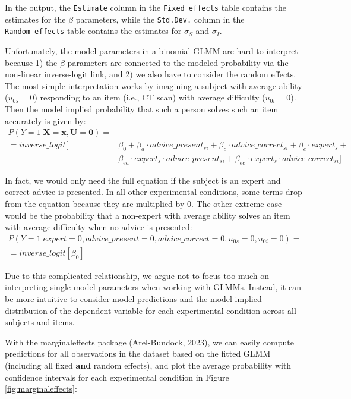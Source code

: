 \documentclass[
  man,floatsintext]{apa6}
\begin{document}
In the output, the \texttt{Estimate} column in the \texttt{Fixed\ effects} table contains the estimates for the \(\beta\) parameters, while the \texttt{Std.Dev.} column in the \texttt{Random\ effects} table contains the estimates for \(\sigma_S\) and \(\sigma_I\).

Unfortunately, the model parameters in a binomial GLMM are hard to interpret because 1) the \(\beta\) parameters are connected to the modeled probability via the non-linear inverse-logit link, and 2) we also have to consider the random effects. The most simple interpretation works by imagining a subject with average ability (\(u_{0s} = 0\)) responding to an item (i.e., CT scan) with average difficulty (\(u_{0i} = 0\)). Then the model implied probability that such a person solves such an item accurately is given by: \[
\begin{aligned}
P(Y=1|\mathbf{X=x}, \mathbf{U} = \mathbf{0}) = \\
= inverse\_logit[&\beta_0 + \beta_a \cdot advice\_present_{si} + \beta_c \cdot advice\_correct_{si} + \beta_e \cdot expert_s + \\
&\beta_{ea} \cdot expert_{s} \cdot advice\_present_{si} + \beta_{ec} \cdot expert_{s} \cdot advice\_correct_{si}]
\end{aligned}
\]

In fact, we would only need the full equation if the subject is an expert and correct advice is presented. In all other experimental conditions, some terms drop from the equation because they are multiplied by \(0\). The other extreme case would be the probability that a non-expert with average ability solves an item with average difficulty when no advice is presented: \[
\begin{aligned}
P(Y=1|expert = 0, advice\_present = 0, advice\_correct = 0, u_{0s} = 0, u_{0i} = 0) = \\
= inverse\_logit[\beta_0]
\end{aligned}
\]

Due to this complicated relationship, we argue not to focus too much on interpreting single model parameters when working with GLMMs. Instead, it can be more intuitive to consider model predictions and the model-implied distribution of the dependent variable for each experimental condition across all subjects and items.

With the marginaleffects package (Arel-Bundock, 2023), we can easily compute predictions for all observations in the dataset based on the fitted GLMM (including all fixed \textbf{and} random effects), and plot the average probability with confidence intervals for each experimental condition in Figure \ref{fig:marginaleffects}:
\end{document}
